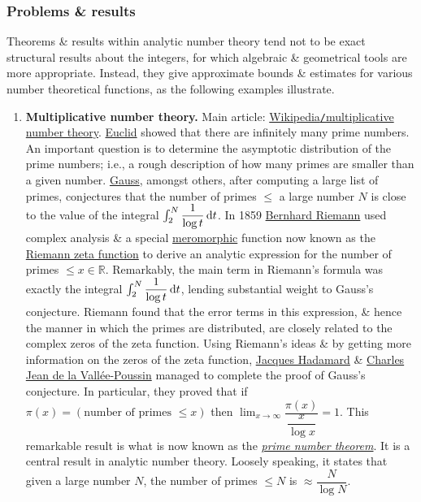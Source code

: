 \documentclass{article}
\begin{document}
\subsubsection{Problems \& results}
Theorems \& results within analytic number theory tend not to be exact structural results about the integers, for which algebraic \& geometrical tools are more appropriate. Instead, they give approximate bounds \& estimates for various number theoretical functions, as the following examples illustrate.
\begin{enumerate}
	\item {\bf Multiplicative number theory.} Main article: \href{https://en.wikipedia.org/wiki/Multiplicative_number_theory}{Wikipedia{\tt/}multiplicative number theory}. \href{https://en.wikipedia.org/wiki/Euclid}{\sc Euclid} showed that there are infinitely many prime numbers. An important question is to determine the asymptotic distribution of the prime numbers; i.e., a rough description of how many primes are smaller than a given number. \href{https://en.wikipedia.org/wiki/Carl_Gauss}{\sc Gauss}, amongst others, after computing a large list of primes, conjectures that the number of primes $\le$ a large number $N$ is close to the value of the integral $\int_2^N \dfrac{1}{\log t}\,{\rm d}t$. In 1859 \href{https://en.wikipedia.org/wiki/Bernhard_Riemann}{\sc Bernhard Riemann} used complex analysis \& a special \href{https://en.wikipedia.org/wiki/Meromorphic}{meromorphic} function now known as the \href{https://en.wikipedia.org/wiki/Riemann_zeta_function}{Riemann zeta function} to derive an analytic expression for the number of primes $\le x\in\mathbb{R}$. Remarkably, the main term in Riemann's formula was exactly the integral $\int_2^N \dfrac{1}{\log t}\,{\rm d}t$, lending substantial weight to {\sc Gauss}'s conjecture. {\sc Riemann} found that the error terms in this expression, \& hence the manner in which the primes are distributed, are closely related to the complex zeros of the zeta function. Using {\sc Riemann}'s ideas \& by getting more information on the zeros of the zeta function, \href{https://en.wikipedia.org/wiki/Jacques_Hadamard}{\sc Jacques Hadamard} \& \href{https://en.wikipedia.org/wiki/Charles_Jean_de_la_Vall%C3%A9e-Poussin}{\sc Charles Jean de la Vall\'ee-Poussin} managed to complete the proof of {\sc Gauss}'s conjecture. In particular, they proved that if $\pi(x) = (\mbox{number of primes }\le x)$ then $\lim_{x\to\infty} \dfrac{\pi(x)}{\dfrac{x}{\log x}} = 1$. This remarkable result is what is now known as the \href{https://en.wikipedia.org/wiki/Prime_number_theorem}{\it prime number theorem}. It is a central result in analytic number theory. Loosely speaking, it states that given a large number $N$, the number of primes $\le N$ is $\approx\dfrac{N}{\log N}$.
	

\end{enumerate}
\end{document}
